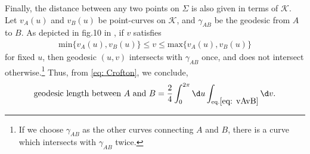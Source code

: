 \documentclass[12pt]{article}
\begin{document}
Finally, the distance between any two points on $\Sigma$ is also given in terms of $\mathcal K$.
Let $v_A(u)$ and $v_B(u)$ be point-curves on $\mathcal K$, and $\gamma_{AB}$ be the geodesic from $A$ to $B$.
As depicted in fig.10 in \cite{Czech:2015qta}, if $v$ satisfies
\begin{align}
	\mathrm{min}\{v_A(u),v_B(u)\}\leq v \leq \mathrm{max}\{v_A(u),v_B(u)\}
	\label{eq: vAvB}
\end{align}
for fixed $u$, then geodesic $(u,v)$ intersects with $\gamma_{AB}$ once, and does not intersect otherwise.\footnote{
If we choose $\gamma_{AB}$ as the other curves connecting $A$ and $B$, there is a curve which intersects with $\gamma_{AB}$ twice.}
Thus, from \eqref{eq: Crofton}, we conclude,
\begin{align}
	\mbox{geodesic length between $A$ and $B$} = 
	\frac{2}{4}\int_0^{2\pi}\d u\int_{\mathrm{eq}.\eqref{eq: vAvB}}\d v.
\end{align}































 

\end{document}
